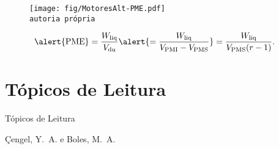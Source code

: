    \begin{frame}
        \begin{center}
            \begin{figure}
                \fontsize{3.0}{4}\selectfont
                \texttt{[image: fig/MotoresAlt-PME.pdf]}
                \\\vspace*{-2.5em}\texttt{autoria própria}
            \end{figure}
        \end{center}
        \begin{align*}
            \alert{\mathrm{PME}} &
            = \frac{W_\mathrm{liq}}{V_\mathrm{du}}
            \alert{= \frac{W_\mathrm{liq}}{\VPMI - \VPMS}}
            = \frac{W_\mathrm{liq}}{\VPMS(r-1)}.
        \end{align*}
    \end{frame}

\section{Tópicos de Leitura}

    \begin{frame}[allowframebreaks]{Tópicos de Leitura}
        \begin{thebibliography}{Çengel, Y.~A., 2013}
                Çengel, Y.~A. e Boles, M.~A.
        \end{thebibliography}
    \end{frame}




